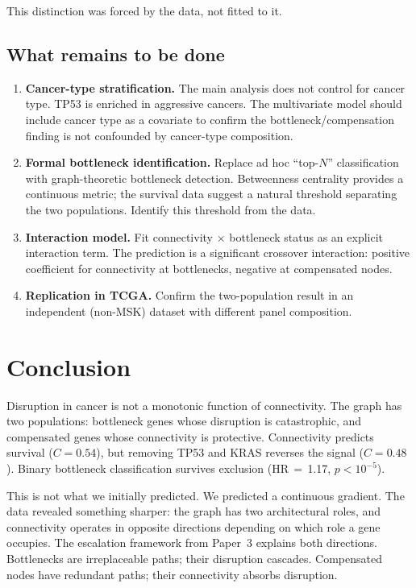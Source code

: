 \documentclass[11pt]{article}
\begin{document}
This distinction was forced by the data, not fitted to it.

\subsection{What remains to be done}

\begin{enumerate}
\item \textbf{Cancer-type stratification.} The main analysis does
not control for cancer type. TP53 is enriched in aggressive
cancers. The multivariate model should include cancer type as a
covariate to confirm the bottleneck/compensation finding is not
confounded by cancer-type composition.
\item \textbf{Formal bottleneck identification.} Replace ad hoc
``top-$N$'' classification with graph-theoretic bottleneck
detection. Betweenness centrality provides a continuous metric;
the survival data suggest a natural threshold separating the two
populations. Identify this threshold from the data.
\item \textbf{Interaction model.} Fit connectivity $\times$
bottleneck status as an explicit interaction term. The prediction
is a significant crossover interaction: positive coefficient for
connectivity at bottlenecks, negative at compensated nodes.
\item \textbf{Replication in TCGA.} Confirm the two-population
result in an independent (non-MSK) dataset with different panel
composition.
\end{enumerate}

\section{Conclusion}
\label{sec:conclusion}

Disruption in cancer is not a monotonic function of connectivity.
The graph has two populations: bottleneck genes whose disruption is
catastrophic, and compensated genes whose connectivity is
protective. Connectivity predicts survival ($C = 0.54$), but
removing TP53 and KRAS reverses the signal ($C = 0.48$). Binary
bottleneck classification survives exclusion (HR\,$=$\,1.17,
$p < 10^{-5}$).

This is not what we initially predicted. We predicted a continuous
gradient. The data revealed something sharper: the graph has two
architectural roles, and connectivity operates in opposite
directions depending on which role a gene occupies. The escalation
framework from Paper~3 explains both directions. Bottlenecks are
irreplaceable paths; their disruption cascades. Compensated nodes
have redundant paths; their connectivity absorbs disruption.
\end{document}
